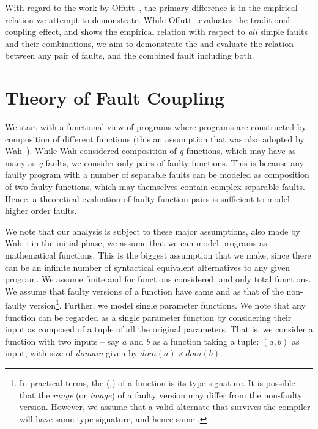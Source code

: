 \documentclass[preprint,nonatbib]{sigplanconf}\usepackage[]{graphicx}\usepackage[]{color}
\begin{document}
With regard to the work by Offutt~\cite{offutt1992investigations}, the primary
difference is in the empirical relation we attempt to demonstrate. While
Offutt~\cite{offutt1992investigations} evaluates the traditional coupling
effect, and shows the empirical relation with respect to \emph{all} simple
faults and their combinations, we aim to demonstrate the \efaultT
and evaluate the relation between any pair of faults, and the combined fault
including both.



\section{Theory of Fault Coupling}
\label{sec:theory}

We start with a functional view of programs where programs are constructed by
composition of different functions (this an assumption that was also adopted by Wah~\cite{wah2003ananalysis}).
While Wah considered composition of \emph{q} functions, which may have as many
as \emph{q} faults, we consider only pairs of faulty functions. This is because
any faulty program with a number of separable faults can be modeled as
composition of two faulty functions, which may themselves contain complex
separable faults. Hence, a theoretical evaluation of faulty function pairs is
sufficient to model higher order faults.

We note that our analysis
is subject to these major assumptions,
also made by Wah~\cite{wah2000atheoretical}:
in the initial phase, we assume that we can model programs as mathematical functions. This
is the biggest assumption that we make, since there can be an infinite number
of syntactical equivalent alternatives to any given program.
We assume finite \finput and \foutput for functions considered, and only total
functions. We assume that faulty versions of a function have same \finput and
\foutput as that of the non-faulty version\footnote{
In practical terms, the (\finput,\foutput) of a function is its type signature.
It is possible that the \emph{range} (or \emph{image}) of a faulty version may
differ from the non-faulty version. However, we assume that a valid alternate
that survives the compiler will
have same type signature, and hence same \foutput.
}.
Further, we model single parameter functions. We note that any function can be
regarded as a single parameter function by considering their input as composed
of a tuple of all the original parameters. That is, we consider a function with
two inputs -- say $a$ and $b$ as a function taking a tuple: $(a,b)$ as input,
with size of \emph{domain} given by $dom(a) \times dom(b)$.
\end{document}
